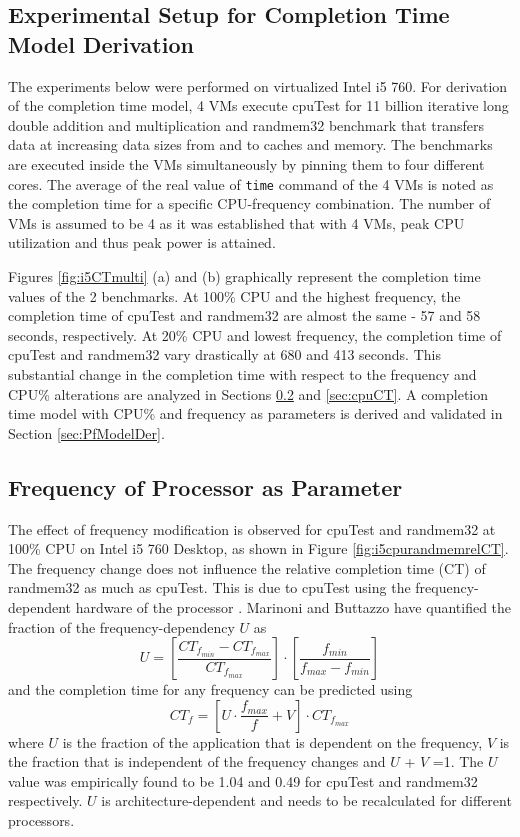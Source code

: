 \documentclass{sig-alternate}
\begin{document}
\subsection{Experimental Setup for Completion Time Model Derivation}
\label{expCT}
The experiments below were performed on virtualized Intel i5 760. For derivation of the completion time model, 4 VMs execute cpuTest for 11 billion iterative long double addition and multiplication and randmem32 \cite{randmem} benchmark that transfers data at increasing data sizes from and to caches and memory. The benchmarks are executed inside the VMs simultaneously by pinning them to four different cores. The average of the real value of \texttt{time} command of the 4 VMs is noted as the completion time for a specific CPU-frequency combination. The number of VMs is assumed to be 4 as it was established that with 4 VMs, peak CPU utilization and thus peak power is attained.

Figures \ref{fig:i5CTmulti} (a) and (b) graphically represent the completion time values of the 2 benchmarks. At 100\% CPU and the highest frequency, the completion time of cpuTest and randmem32 are almost the same - 57 and 58 seconds, respectively. At 20\% CPU and lowest frequency, the completion time of cpuTest and randmem32 vary drastically at 680 and 413 seconds. This substantial change in the completion time with respect to the frequency and CPU\% alterations are analyzed in Sections \ref{sec:freqCT} and \ref{sec:cpuCT}. A completion time model with CPU\% and frequency as parameters is derived and validated in Section \ref{sec:PfModelDer}.

\vspace{-0.1cm}

\subsection{Frequency of Processor as Parameter}
\label{sec:freqCT}
The effect of frequency modification is observed for cpuTest and randmem32 at 100\% CPU on Intel i5 760 Desktop, as shown in Figure \ref{fig:i5cpurandmemrelCT}. The frequency change does not influence the relative completion time (CT) of randmem32 as much as cpuTest. This is due to cpuTest using the frequency-dependent hardware of the processor \cite{Venkatachalam2006}. 
Marinoni and Buttazzo \cite{Marinoni2007} have quantified the fraction of the frequency-dependency $U$ as 
$$ U = [ \frac{CT_{f_{min}}-CT_{f_{max}}}{CT_{f_{max}}} ] \cdot [ \frac{f_{min}}{f_{max}-f_{min}} ]$$
and the completion time for any frequency can be predicted using 
\begin{equation}
 \label{eq:freq}
 CT_f = [ U \cdot \frac{f_{max}}{f} + V ] \cdot CT_{f_{max}}
\end{equation}
where $U$ is the fraction of the application that is dependent on the frequency, $V$ is the fraction that is independent of the frequency changes and $U$ + $V$ =1. The $U$ value was empirically found to be 1.04 and 0.49 for cpuTest and randmem32 respectively. $U$ is architecture-dependent \cite{Marinoni2007} and needs to be recalculated for different processors. 
\end{document}
